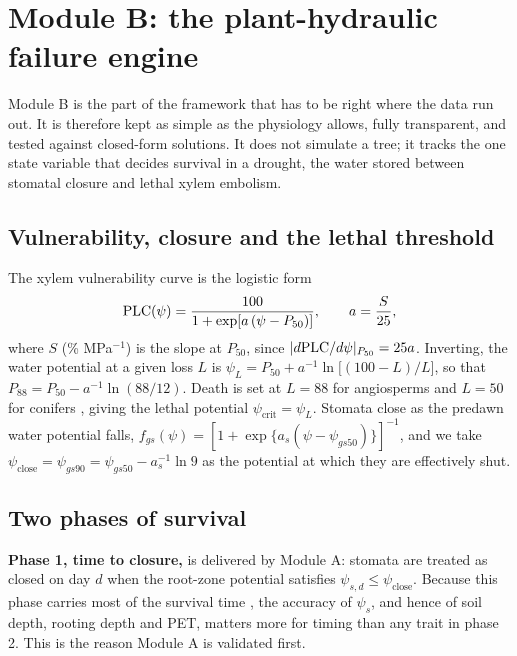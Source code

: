 \section{Module B: the plant-hydraulic failure engine}\label{sec:B}

Module B is the part of the framework that has to be right where the data run out. It is therefore kept as simple as the physiology allows, fully transparent, and tested against closed-form solutions. It does not simulate a tree; it tracks the one state variable that decides survival in a drought, the water stored between stomatal closure and lethal xylem embolism.

\subsection{Vulnerability, closure and the lethal threshold}
The xylem vulnerability curve is the logistic form \citep{Pammenter1998}
\begin{equation}\label{eq:plc}
\mathrm{PLC}(\psi)=\frac{100}{1+\exp[a\,(\psi-P_{50})]},\qquad a=\frac{S}{25},
\end{equation}
where $S$ (\% MPa$^{-1}$) is the slope at $P_{50}$, since $|d\mathrm{PLC}/d\psi|_{P_{50}}=25a$. Inverting, the water potential at a given loss $L$ is $\psi_L=P_{50}+a^{-1}\ln\!\big[(100-L)/L\big]$, so that $P_{88}=P_{50}-a^{-1}\ln(88/12)$. Death is set at $L=88$ for angiosperms \citep{Urli2013} and $L=50$ for conifers \citep{Brodribb2009}, giving the lethal potential $\psi_{\text{crit}}=\psi_L$. Stomata close as the predawn water potential falls, $f_{gs}(\psi)=[1+\exp\{a_s(\psi-\psi_{gs50})\}]^{-1}$, and we take $\psi_{\text{close}}=\psi_{gs90}=\psi_{gs50}-a_s^{-1}\ln 9$ as the potential at which they are effectively shut.

\subsection{Two phases of survival}
\textbf{Phase 1, time to closure,} is delivered by Module A: stomata are treated as closed on day $d$ when the root-zone potential satisfies $\psi_{s,d}\le\psi_{\text{close}}$. Because this phase carries most of the survival time \citep{Waite2026,Gauthey2026}, the accuracy of $\psi_s$, and hence of soil depth, rooting depth and PET, matters more for timing than any trait in phase 2. This is the reason Module A is validated first.

